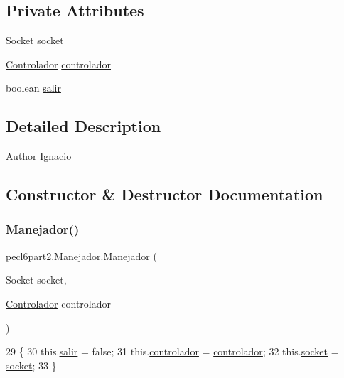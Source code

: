 \subsection*{Private Attributes}
\begin{DoxyCompactItemize}
\item 
Socket \mbox{\hyperlink{classpecl6part2_1_1_manejador_abc6cd500e4ba790bc3ec8415b15c4402}{socket}}
\item 
\mbox{\hyperlink{classpecl6part2_1_1_controlador}{Controlador}} \mbox{\hyperlink{classpecl6part2_1_1_manejador_a8c505f81f85f3c9966ab7e7b1df1ce52}{controlador}}
\item 
boolean \mbox{\hyperlink{classpecl6part2_1_1_manejador_ad89c1ebe96b5a689227a38946ddc5b5d}{salir}}
\end{DoxyCompactItemize}


\subsection{Detailed Description}
\begin{DoxyAuthor}{Author}
Ignacio 
\end{DoxyAuthor}


\subsection{Constructor \& Destructor Documentation}
\mbox{\label{classpecl6part2_1_1_manejador_a2dfa6bc9597c33674de7f04523bbd225}} 
\subsubsection{\texorpdfstring{Manejador()}{Manejador()}}
{\footnotesize\ttfamily pecl6part2.\+Manejador.\+Manejador (\begin{DoxyParamCaption}\item[{Socket}]{socket,  }\item[{\mbox{\hyperlink{classpecl6part2_1_1_controlador}{Controlador}}}]{controlador }\end{DoxyParamCaption})\hspace{0.3cm}{\ttfamily [inline]}}


\begin{DoxyCode}
29     \{
30         this.\mbox{\hyperlink{classpecl6part2_1_1_manejador_ad89c1ebe96b5a689227a38946ddc5b5d}{salir}} = \textcolor{keyword}{false};
31         this.\mbox{\hyperlink{classpecl6part2_1_1_manejador_a8c505f81f85f3c9966ab7e7b1df1ce52}{controlador}} = \mbox{\hyperlink{classpecl6part2_1_1_manejador_a8c505f81f85f3c9966ab7e7b1df1ce52}{controlador}};
32         this.\mbox{\hyperlink{classpecl6part2_1_1_manejador_abc6cd500e4ba790bc3ec8415b15c4402}{socket}} = \mbox{\hyperlink{classpecl6part2_1_1_manejador_abc6cd500e4ba790bc3ec8415b15c4402}{socket}};
33     \}
\end{DoxyCode}


